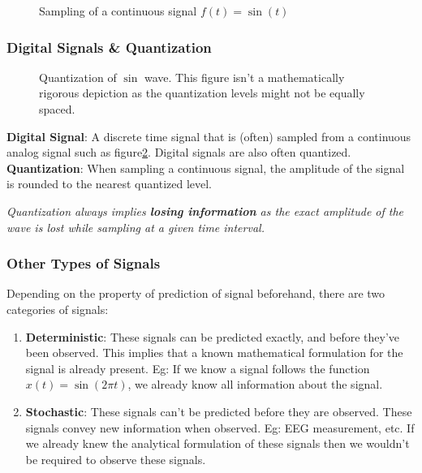 \documentclass[letterpaper,12pt]{article}
\begin{document}
\begin{figure}
    \centering
    \caption{Sampling of a continuous signal $f(t) = \sin(t)$}\label{fig:sampling_signal}
\end{figure}

\subsubsection*{Digital Signals \& Quantization}

\begin{figure}[!ht]
    \centering
    \caption{Quantization of $\sin$ wave. This figure isn't a mathematically rigorous depiction as the quantization levels might not be equally spaced.}\label{fig:sampling_signal_quantized}
\end{figure}

\textbf{Digital Signal}: A discrete time signal that is (often) sampled from a continuous analog signal such as figure\ref{fig:sampling_signal_quantized}. Digital signals are also often quantized. \\
\textbf{Quantization}: When sampling a continuous signal, the amplitude of the signal is rounded to the nearest quantized level.

\textit{Quantization always implies \textbf{losing information} as the exact amplitude of the wave is lost while sampling at a given time interval.}

\subsubsection*{Other Types of Signals}
Depending on the property of prediction of signal beforehand, there are two categories of signals:
\begin{enumerate}
    \item \textbf{Deterministic}: These signals can be predicted exactly, and before they've been observed. This implies that a known mathematical formulation for the signal is already present. Eg: If we know a signal follows the function \(x(t) = \sin(2{\pi}t)\), we already know all information about the signal.
    \item \textbf{Stochastic}: These signals can't be predicted before they are observed. These signals convey new information when observed.  Eg: EEG measurement, etc. If we already knew the analytical formulation of these signals then we wouldn't be required to observe these signals.
\end{enumerate}
\end{document}
